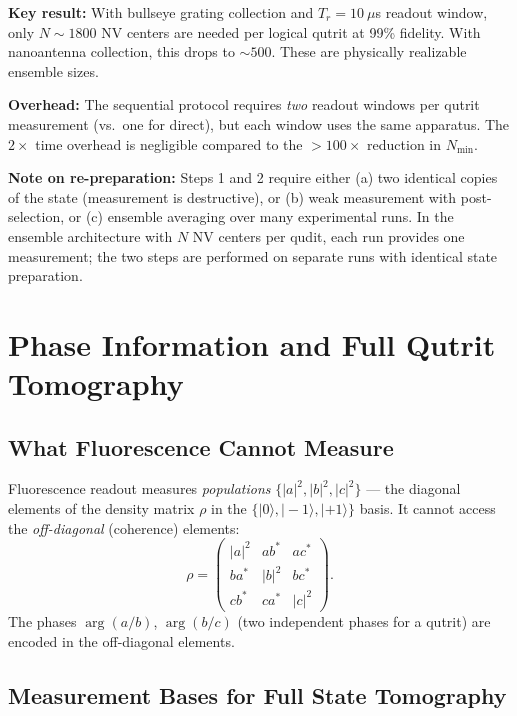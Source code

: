 \documentclass[11pt,letterpaper]{article}
\begin{document}
\textbf{Key result:} With bullseye grating collection and $T_r = 10~\mu$s
readout window, only $N \sim 1800$ NV centers are needed per logical qutrit
at 99\% fidelity.  With nanoantenna collection, this drops to $\sim 500$.
These are physically realizable ensemble sizes.

\textbf{Overhead:} The sequential protocol requires \emph{two} readout
windows per qutrit measurement (vs.\ one for direct), but each window
uses the same apparatus.  The $2\times$ time overhead is negligible compared
to the $>100\times$ reduction in $N_{\min}$.

\textbf{Note on re-preparation:} Steps 1 and 2 require either (a) two
identical copies of the state (measurement is destructive), or (b) weak
measurement with post-selection, or (c) ensemble averaging over many
experimental runs.  In the ensemble architecture with $N$ NV centers per
qudit, each run provides one measurement; the two steps are performed on
separate runs with identical state preparation.


\section{Phase Information and Full Qutrit Tomography}
\label{sec:tomography}

\subsection{What Fluorescence Cannot Measure}

Fluorescence readout measures \emph{populations} $\{|a|^2, |b|^2, |c|^2\}$
--- the diagonal elements of the density matrix $\rho$ in the $\{|0\rangle,
|-1\rangle, |+1\rangle\}$ basis.  It cannot access the \emph{off-diagonal}
(coherence) elements:
\begin{equation}
  \rho = \begin{pmatrix}
    |a|^2 & a b^* & a c^* \\
    b a^* & |b|^2 & b c^* \\
    c b^* & c a^* & |c|^2
  \end{pmatrix}.
\end{equation}
The phases $\arg(a/b)$, $\arg(b/c)$ (two independent phases for a qutrit)
are encoded in the off-diagonal elements.

\subsection{Measurement Bases for Full State Tomography}
\end{document}

